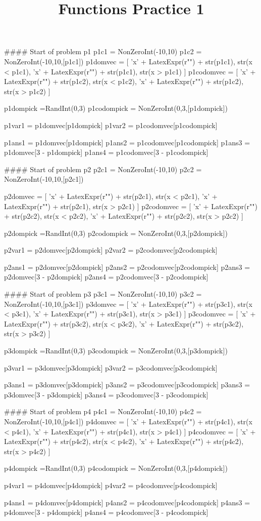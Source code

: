 \documentclass{ximeraXloud}
\title{Functions Practice 1}
\begin{document}


\begin{sagesilent}
#### Start of problem p1
p1c1 = NonZeroInt(-10,10)
p1c2 = NonZeroInt(-10,10,[p1c1])
p1domvec = [ 'x' + LatexExpr(r"\leq") + str(p1c1), str(x < p1c1), 'x' + LatexExpr(r"\geq") + str(p1c1), str(x > p1c1) ]
p1codomvec = [ 'x' + LatexExpr(r"\leq") + str(p1c2), str(x < p1c2), 'x' + LatexExpr(r"\geq") + str(p1c2), str(x > p1c2) ]

p1dompick =RandInt(0,3)
p1codompick = NonZeroInt(0,3,[p1dompick])

p1var1 = p1domvec[p1dompick]
p1var2 = p1codomvec[p1codompick]

p1ans1 = p1domvec[p1dompick]
p1ans2 = p1codomvec[p1codompick]
p1ans3 = p1domvec[3 - p1dompick]
p1ans4 = p1codomvec[3 - p1codompick]


#### Start of problem p2
p2c1 = NonZeroInt(-10,10)
p2c2 = NonZeroInt(-10,10,[p2c1])

p2domvec = [ 'x' + LatexExpr(r"\leq") + str(p2c1), str(x < p2c1), 'x' + LatexExpr(r"\geq") + str(p2c1), str(x > p2c1) ]
p2codomvec = [ 'x' + LatexExpr(r"\leq") + str(p2c2), str(x < p2c2), 'x' + LatexExpr(r"\geq") + str(p2c2), str(x > p2c2) ]

p2dompick =RandInt(0,3)
p2codompick = NonZeroInt(0,3,[p2dompick])

p2var1 = p2domvec[p2dompick]
p2var2 = p2codomvec[p2codompick]

p2ans1 = p2domvec[p2dompick]
p2ans2 = p2codomvec[p2codompick]
p2ans3 = p2domvec[3 - p2dompick]
p2ans4 = p2codomvec[3 - p2codompick]


#### Start of problem p3
p3c1 = NonZeroInt(-10,10)
p3c2 = NonZeroInt(-10,10,[p3c1])
p3domvec = [ 'x' + LatexExpr(r"\leq") + str(p3c1), str(x < p3c1), 'x' + LatexExpr(r"\geq") + str(p3c1), str(x > p3c1) ]
p3codomvec = [ 'x' + LatexExpr(r"\leq") + str(p3c2), str(x < p3c2), 'x' + LatexExpr(r"\geq") + str(p3c2), str(x > p3c2) ]

p3dompick =RandInt(0,3)
p3codompick = NonZeroInt(0,3,[p3dompick])

p3var1 = p3domvec[p3dompick]
p3var2 = p3codomvec[p3codompick]

p3ans1 = p3domvec[p3dompick]
p3ans2 = p3codomvec[p3codompick]
p3ans3 = p3domvec[3 - p3dompick]
p3ans4 = p3codomvec[3 - p3codompick]


#### Start of problem p4
p4c1 = NonZeroInt(-10,10)
p4c2 = NonZeroInt(-10,10,[p4c1])
p4domvec = [ 'x' + LatexExpr(r"\leq") + str(p4c1), str(x < p4c1), 'x' + LatexExpr(r"\geq") + str(p4c1), str(x > p4c1) ]
p4codomvec = [ 'x' + LatexExpr(r"\leq") + str(p4c2), str(x < p4c2), 'x' + LatexExpr(r"\geq") + str(p4c2), str(x > p4c2) ]


p4dompick =RandInt(0,3)
p4codompick = NonZeroInt(0,3,[p4dompick])

p4var1 = p4domvec[p4dompick]
p4var2 = p4codomvec[p4codompick]

p4ans1 = p4domvec[p4dompick]
p4ans2 = p4codomvec[p4codompick]
p4ans3 = p4domvec[3 - p4dompick]
p4ans4 = p4codomvec[3 - p4codompick]




\end{sagesilent}
\end{document}
